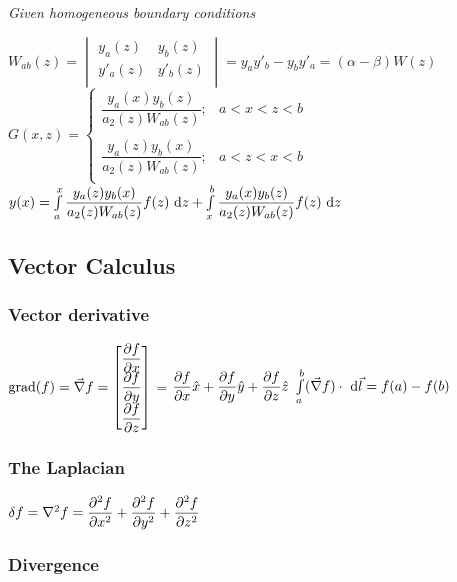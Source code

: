 \textit{Given homogeneous boundary conditions}
\def \arraystretch{1.4}
\begin{itemize}
\itemt \( W_{ab}(z) = 
\begin{vmatrix}
y_a(z)	&	y_b(z)	\\
y'_a(z)	&	y'_b(z)	\\
\end{vmatrix} = y_a y'_b - y_b y'_a = (\alpha - \beta) W(z)  \)
\itemt \( G(x,z) = 
\begin{cases}
\dfrac{y_a(x)y_b(z)}{a_2(z)W_{ab}(z)};	& a<x<z<b \\
\\
\dfrac{y_a(z)y_b(x)}{a_2(z)W_{ab}(z)};	& a<z<x<b \\
\end{cases}\)
\itemt \( y(x) = \int\limits^x_a \dfrac{y_a(z)y_b(x)}{a_2(z)W_{ab}(z)} f(z) \ \mathrm{d}z + \int\limits^b_x \dfrac{y_a(x)y_b(z)}{a_2(z)W_{ab}(z)} f(z) \ \mathrm{d}z \)
\end{itemize}
        
\subsection{Vector Calculus}

\subsubsection{Vector derivative}
\begin{itemize}
\itemt \( \mathrm{grad} (f) = \vec{\nabla} f = 
\begin{bmatrix}
\dfrac{\partial f}{\partial x} 	\\
\dfrac{\partial f}{\partial y} 	\\
\dfrac{\partial f}{\partial z} 	\\
\end{bmatrix}
\) = \( \dfrac{\partial f}{\partial x} \hat{x} + \dfrac{\partial f}{\partial y} \hat{y} + \dfrac{\partial f}{\partial z} \hat{z}\)
\itemt \( \int\limits_a^b (\vec{\nabla}f)\cdot \ \mathrm{d}\vec{l} = f(a) - f(b)\)
\end{itemize}

\subsubsection{The Laplacian}
\begin{itemize}
\itemt \( \delta f = \nabla^2 f = \dfrac{\partial ^2f}{\partial x^2} + \dfrac{\partial ^2f}{\partial y^2} + \dfrac{\partial ^2f}{\partial z^2}\)
\end{itemize}

\subsubsection{Divergence}


